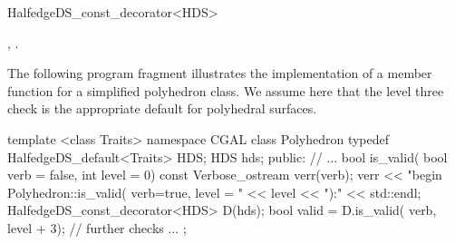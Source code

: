 \begin{ccRefClass}{HalfedgeDS_const_decorator<HDS>}



\ccSeeAlso

,
.

\ccExample

The following program fragment illustrates the implementation of a
 member function for a simplified polyhedron class.
We assume here that the level three check is the appropriate default
for polyhedral surfaces.

\begin{ccExampleCode}
template <class Traits>
namespace CGAL {
    class Polyhedron {
	typedef HalfedgeDS_default<Traits> HDS;
	HDS hds;
    public:
	// ...
	bool is_valid( bool verb = false, int level = 0) const {
	    Verbose_ostream verr(verb);
	    verr << "begin Polyhedron::is_valid( verb=true, level = " << level 
		 << "):" << std::endl;
	    HalfedgeDS_const_decorator<HDS> D(hds);
	    bool valid = D.is_valid( verb, level + 3);
	    // further checks ...
	}
    };
}
\end{ccExampleCode}

\end{ccRefClass}

\ccRefPageEnd
